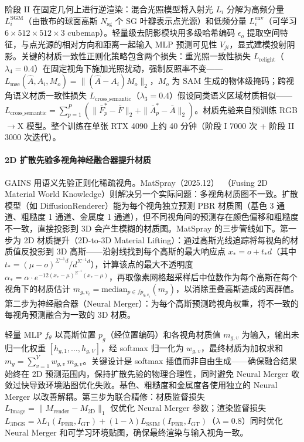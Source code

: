 阶段 II 在固定几何上进行逆渲染：混合光照模型将入射光 $L_i$ 分解为高频分量 $L_i^{\text{SGM}}$（由散布的球面高斯 $N_{\text{sg}}$ 个 SG 叶瓣表示点光源）和低频分量 $L_i^{\text{env}}$（可学习 $6\times512\times512\times3$ cubemap）。轻量级去阴影模块用多级哈希编码 $\epsilon_o$ 提取空间特征，与点光源的相对方向和距离一起输入 MLP 预测可见性 $V_{ji}$，显式建模投射阴影。关键的材质一致性正则化策略包含两个损失：重光照一致性损失 $L_{\text{relight}}$（$\lambda_4=0.4$）在固定视角下施加光照扰动，强制反照率不变——$L_{\text{mse}}(\hat{A}, A_i, M_o) = \|(\hat{A} - A_i) M_o\|_2$，$M_o$ 为 SAM 生成的物体级掩码；跨视角语义材质一致性损失 $L_{\text{cross\_semantic}}$（$\lambda_3=0.4$）假设同类语义区域材质相似——$L_{\text{cross\_semantic}} = \sum_{p=1}^P (\|\bar{F}_p^* - \bar{F}\|_2 + \|\bar{A}_p^* - \bar{A}\|_2)$。材质先验来自预训练 RGB$\to$X 模型。整个训练在单张 RTX 4090 上约 40 分钟（阶段 I 7000 次 + 阶段 II 3000 次迭代）。

\paragraph{2D 扩散先验多视角神经融合器提升材质}

GAINS 用语义先验正则化稀疏视角。MatSpray（2025.12）~\cite{2512_18314}（Fusing 2D Material World Knowledge）则解决另一个实际问题：多视角材质图不一致。扩散模型（如 DiffusionRenderer）能为每个视角独立预测 PBR 材质图（基色 3 通道、粗糙度 1 通道、金属度 1 通道），但不同视角间的预测存在颜色偏移和粗糙度不一致，直接投影到 3D 会产生模糊的材质图。MatSpray 的三步管线如下。第一步为 2D 材质提升（2D-to-3D Material Lifting）：通过高斯光线追踪将每视角的材质值反投影到 3D 高斯——沿射线找到每个高斯的最大响应点 $x_* = o + t_* d$（其中 $t_* = (\mu - o)^{\Sigma^{-1} d} / d^{\Sigma^{-1} d}$），计算该点的最大不透明度 $\alpha_* = \alpha \cdot e^{-12(x_* - \mu)^{\Sigma^{-1}}(x_* - \mu)}$，再取像素网格超采样后中位数作为每个高斯在每个视角下的材质估计 $m_{g,v_i} = \text{median}_{p \in fp_{g,v_i}}(m_p)$，以消除重叠高斯造成的离群值。第二步为神经融合器（Neural Merger）：为每个高斯预测跨视角权重，将不一致的每视角预测融合为一致的 3D 材质。

轻量 MLP $f_\theta$ 以高斯位置 $p_g$（经位置编码）和各视角材质值 $m_{g,v}$ 为输入，输出未归一化权重 $[h_{g,1}, \ldots, h_{g,V}]$，经 softmax 归一化为 $w_{g,v}$，最终材质为加权求和 $m_g = \sum_{v=1}^V w_{g,v} \, m_{g,v}$。关键设计是 softmax 插值而非自由生成——确保融合结果始终在 2D 预测范围内，保持扩散先验的物理合理性，同时避免 Neural Merger 收敛过快导致环境贴图优化失败。基色、粗糙度和金属度各使用独立的 Neural Merger 以改善解耦。第三步为联合精修：材质监督损失 $L_{\text{Image}} = \|M_{\text{render}} - M_{\text{2D}}\|_1$ 仅优化 Neural Merger 参数；渲染监督损失 $L_{\text{3DGS}} = \lambda L_1(I_{\text{PBR}}, I_{\text{GT}}) + (1-\lambda) L_{\text{SSIM}}(I_{\text{PBR}}, I_{\text{GT}})$（$\lambda=0.8$）同时优化 Neural Merger 和可学习环境贴图，确保最终渲染与输入视角一致。

